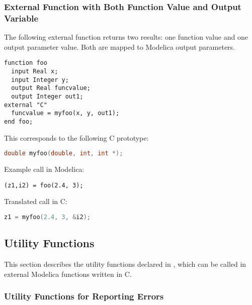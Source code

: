 \subsubsection{External Function with Both Function Value and Output Variable}\label{external-function-with-both-function-value-and-output-variable}

\begin{example}
The following external function returns two results: one
function value and one output parameter value. Both are mapped to
Modelica output parameters.
\begin{lstlisting}[language=modelica]
function foo
  input Real x;
  input Integer y;
  output Real funcvalue;
  output Integer out1;
external "C"
  funcvalue = myfoo(x, y, out1);
end foo;
\end{lstlisting}
This corresponds to the following C prototype:
\begin{lstlisting}[language=C]
double myfoo(double, int, int *);
\end{lstlisting}
Example call in Modelica:
\begin{lstlisting}[language=modelica]
(z1,i2) = foo(2.4, 3);
\end{lstlisting}
Translated call in C:
\begin{lstlisting}[language=C]
z1 = myfoo(2.4, 3, &i2);
\end{lstlisting}
\end{example}

\subsection{Utility Functions}\label{utility-functions}

This section describes the utility functions declared in , which can be called in external Modelica functions written in C.

\subsubsection{Utility Functions for Reporting Errors}\label{utility-functions-for-reporting-errors}

